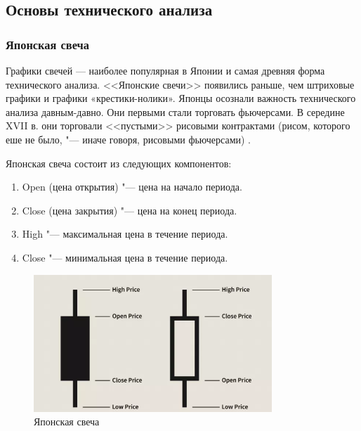 \documentclass[bachelor, och, coursework]{SCWorks}
\begin{document}
        \subsection{Основы технического анализа}

            \subsubsection{Японская свеча}

            Графики свечей — наиболее популярная в Японии и самая древняя форма
            технического анализа. <<Японские свечи>> появились раньше, чем
            штриховые графики и графики «крестики-нолики». Японцы осознали
            важность технического анализа давным-давно. Они первыми стали
            торговать фьючерсами. В середине XVII в. они торговали <<пустыми>>
            рисовыми контрактами (рисом, которого еше не было, "--- иначе
            говоря, рисовыми фьючерсами) \cite{wagner1993trading}.

            Японская свеча состоит из следующих компонентов: 
            \begin{enumerate}
                \item Open (цена открытия) "--- цена на начало периода.
                \item Close (цена закрытия) "--- цена на конец периода.
                \item High "--- максимальная цена в течение периода.
                \item Close "--- минимальная цена в течение периода.
            \end{enumerate}

            \begin{figure}[H]
                \centering
                \includegraphics[width=0.8\textwidth]{pic/candlestick.png}
                \caption{Японская свеча}
            \end{figure}
\end{document}
